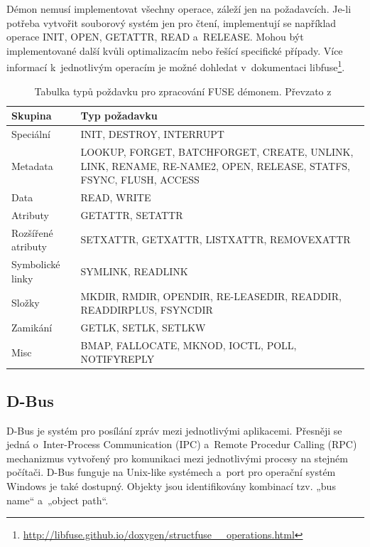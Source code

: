 Démon nemusí implementovat všechny operace, záleží jen na požadavcích. Je-li potřeba vytvořit souborový systém jen pro čtení, implementují se například operace
INIT, OPEN, GETATTR, READ a RELEASE. Mohou být implementované další kvůli optimalizacím nebo řešící specifické případy. Více informací k jednotlivým operacím
je možné dohledat v dokumentaci libfuse\footnote{\url{http://libfuse.github.io/doxygen/structfuse__operations.html}}.

\newpage

\begin{table}[h]
    \begin{center}
        \begin{tabularx}{14cm}{|l|X|} 
            \hline
            \textbf{Skupina} & \textbf{Typ požadavku} \\
            \hline
            Speciální & INIT, DESTROY, INTERRUPT \\
            \hline
            Metadata & LOOKUP, FORGET, BATCHFORGET, CREATE, UNLINK, LINK, RENAME, RE-NAME2, OPEN, RELEASE, STATFS, FSYNC, FLUSH, ACCESS \\
            \hline
            Data & READ, WRITE \\
            \hline
            Atributy & GETATTR, SETATTR \\
            \hline
            Rozšířené atributy & SETXATTR, GETXATTR, LISTXATTR, REMOVEXATTR \\
            \hline
            Symbolické linky & SYMLINK, READLINK \\
            \hline
            Složky & MKDIR, RMDIR, OPENDIR, RE-LEASEDIR, READDIR, READDIRPLUS, FSYNCDIR \\
            \hline
            Zamikání & GETLK, SETLK, SETLKW \\
            \hline
            Misc & BMAP, FALLOCATE, MKNOD, IOCTL, POLL, NOTIFYREPLY \\
            \hline
        \end{tabularx}
        \caption{Tabulka typů poždavku pro zpracování FUSE démonem. Převzato z \cite{FuseOrNotToFuse}}
    \end{center}
\end{table}

\subsection{D-Bus}

D-Bus je systém pro posílání zpráv mezi jednotlivými aplikacemi. Přesněji se jedná o Inter-Process Communication (IPC) a Remote Procedur Calling (RPC) mechanizmus
vytvořený pro komunikaci mezi jednotlivými procesy na stejném počítači. D-Bus funguje na Unix-like systémech a port pro operační systém Windows je také dostupný. Objekty
jsou identifikovány kombinací tzv. „bus name“ a „object path“.\cite{DBus}

